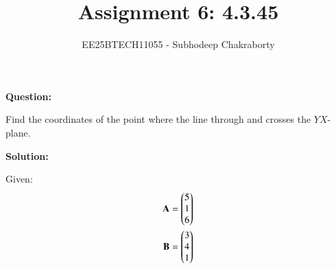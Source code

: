 \documentclass[journal,12pt,onecolumn]{IEEEtran}
\theoremstyle{remark}
\begin{document}

\vspace{3cm}

\title{Assignment 6: 4.3.45}
\author{EE25BTECH11055 - Subhodeep Chakraborty}
\maketitle
\hrulefill
\bigskip

\renewcommand{\thefigure}{\theenumi}
\renewcommand{\thetable}{\theenumi}

\textbf{Question:}\par
Find the coordinates of the point where the line through  and  crosses the $YX$-plane.
\par
\textbf{Solution:}\par

Given:
\begin{align}
 \mathbf{A} = \begin{pmatrix}5\\1\\6\end{pmatrix} \\
 \mathbf{B} = \begin{pmatrix}3\\4\\1\end{pmatrix}
\end{align}
\end{document}
